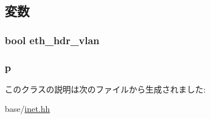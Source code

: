 \subsection{変数}
\hypertarget{classNet_1_1Ip6Ptr_a0d4c03dd0e48319a9a4c5f4148c8a496}{
\subsubsection[{eth\_\-hdr\_\-vlan}]{\setlength{\rightskip}{0pt plus 5cm}bool {\bf eth\_\-hdr\_\-vlan}}}
\label{classNet_1_1Ip6Ptr_a0d4c03dd0e48319a9a4c5f4148c8a496}
\hypertarget{classNet_1_1Ip6Ptr_a764b18a7236ca83fd4bd750516da7d09}{
\subsubsection[{p}]{ {\bf p}}}
\label{classNet_1_1Ip6Ptr_a764b18a7236ca83fd4bd750516da7d09}


このクラスの説明は次のファイルから生成されました:\begin{DoxyCompactItemize}
\item 
base/\hyperlink{inet_8hh}{inet.hh}\end{DoxyCompactItemize}

